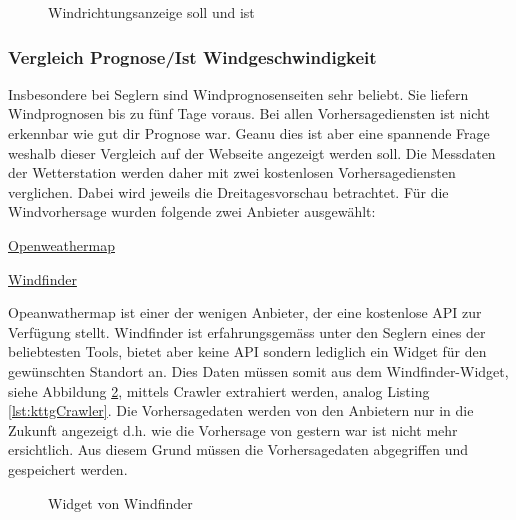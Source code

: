 \begin{figure}[htbp!]
	\centering
	\caption{Windrichtungsanzeige soll und ist}
	\label{img:windrichtung}
\end{figure}

\subsubsection{Vergleich Prognose/Ist Windgeschwindigkeit}
Insbesondere bei Seglern sind Windprognosenseiten sehr beliebt. Sie liefern Windprognosen bis zu fünf Tage voraus. Bei allen Vorhersagediensten ist nicht erkennbar wie gut dir Prognose war. Geanu dies ist aber eine spannende Frage weshalb dieser Vergleich auf der Webseite angezeigt werden soll. Die Messdaten der Wetterstation werden daher mit zwei kostenlosen Vorhersagediensten verglichen. Dabei wird jeweils die Dreitagesvorschau betrachtet. Für die Windvorhersage wurden folgende zwei Anbieter ausgewählt:

\begin{itemize*}
\item \href{https://openweathermap.org/city/2661731}{Openweathermap}
\item \href{https://www.windfinder.com/forecast/arbon}{Windfinder}
\end{itemize*}

\noindent
Opeanwathermap ist einer der wenigen Anbieter, der eine kostenlose API zur Verfügung stellt. Windfinder ist erfahrungsgemäss unter den Seglern eines der beliebtesten Tools, bietet aber keine API sondern lediglich ein Widget für den gewünschten Standort an. Dies Daten müssen somit aus dem Windfinder-Widget, siehe Abbildung \ref{img:windfinder}, mittels Crawler extrahiert werden, analog Listing \ref{lst:kttgCrawler}. Die Vorhersagedaten werden von den Anbietern nur in die Zukunft angezeigt d.h. wie die Vorhersage von gestern war ist nicht mehr ersichtlich. Aus diesem Grund müssen die Vorhersagedaten abgegriffen und gespeichert werden.


\begin{figure}[h!]
	\centering
	\caption{Widget von Windfinder}
	\label{img:windfinder}
\end{figure}

